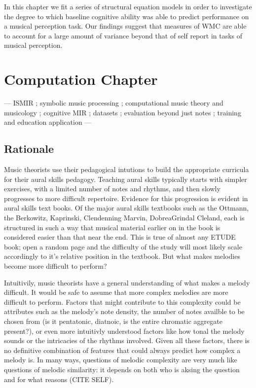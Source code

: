 \documentclass[]{book}
\begin{document}
In this chapter we fit a series of structural equation models in order to investigate the degree to which baseline cognitive ability was able to predict performance on a musical perception task.
Our findings suggest that measures of WMC are able to account for a large amount of variance beyond that of self report in tasks of musical perception.

\hypertarget{computation-chapter}{%
\chapter{Computation Chapter}\label{computation-chapter}}

--- ISMIR
; symbolic music processing
; computational music theory and musicology
; cognitive MIR
; datasets
; evaluation beyond just notes
; training and education application
---

\hypertarget{rationale-1}{%
\section{Rationale}\label{rationale-1}}

Music theorists use their pedagogical intutions to build the appropriate curricula for their aural skills pedagogy.
Teaching aural skills typically starts with simpler exercises, with a limited number of notes and rhythms, and then slowly progresses to more difficult repertoire.
Evidence for this progression is evident in aural skills text books.
Of the major aural skills textbooks such as the Ottmann, the Berkowitz, Kaprinski, Clendenning Marvin, DobreaGrindal Cleland, each is structured in such a way that musical material earlier on in the book is considered easier than that near the end.
This is true of almost any ETUDE book; open a random page and the difficulty of the study will most likely scale accordingly to it's relative position in the textbook.
But what makes melodies become more difficult to perform?

Intuitivily, music theorists have a general understanding of what makes a melody difficult.
It would be safe to assume that more complex melodies are more difficult to perform.
Factors that might contribute to this complexity could be attributes such as the melody's note density, the number of notes availble to be chosen from (is it pentatonic, diatnoic, is the entire chromatic aggregate present?), or even more intuitivly understood factors like how tonal the melody sounds or the intricacies of the rhythms involved.
Given all these factors, there is no definitive combination of features that could always predict how complex a melody is.
In many ways, questions of melodic complexity are very much like questions of melodic similarity: it depends on both who is aksing the question and for what reasons (CITE SELF).
\end{document}
